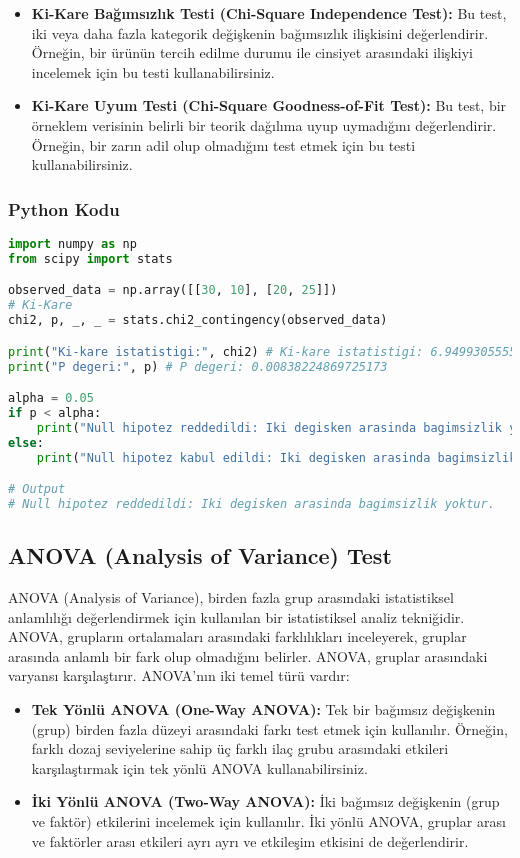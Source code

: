 \begin{itemize}
    \item \textbf{Ki-Kare Bağımsızlık Testi (Chi-Square Independence Test):} Bu test, iki veya daha fazla kategorik değişkenin bağımsızlık ilişkisini değerlendirir. Örneğin, bir ürünün tercih edilme durumu ile cinsiyet arasındaki ilişkiyi incelemek için bu testi kullanabilirsiniz.
    \item \textbf{Ki-Kare Uyum Testi (Chi-Square Goodness-of-Fit Test):} Bu test, bir örneklem verisinin belirli bir teorik dağılıma uyup uymadığını değerlendirir. Örneğin, bir zarın adil olup olmadığını test etmek için bu testi kullanabilirsiniz.
\end{itemize}

\subsubsection{Python Kodu}

\begin{lstlisting}[language=Python]
import numpy as np
from scipy import stats

observed_data = np.array([[30, 10], [20, 25]])
# Ki-Kare
chi2, p, _, _ = stats.chi2_contingency(observed_data)

print("Ki-kare istatistigi:", chi2) # Ki-kare istatistigi: 6.949930555555551
print("P degeri:", p) # P degeri: 0.00838224869725173

alpha = 0.05
if p < alpha:
    print("Null hipotez reddedildi: Iki degisken arasinda bagimsizlik yoktur.")
else:
    print("Null hipotez kabul edildi: Iki degisken arasinda bagimsizlik vardir.")

# Output
# Null hipotez reddedildi: Iki degisken arasinda bagimsizlik yoktur.
\end{lstlisting}

\newpage

\subsection{ANOVA (Analysis of Variance) Test}
ANOVA (Analysis of Variance), birden fazla grup arasındaki istatistiksel anlamlılığı değerlendirmek için kullanılan bir istatistiksel analiz tekniğidir. ANOVA, grupların ortalamaları arasındaki farklılıkları inceleyerek, gruplar arasında anlamlı bir fark olup olmadığını belirler. ANOVA, gruplar arasındaki varyansı karşılaştırır. ANOVA'nın iki temel türü vardır:

\begin{itemize}
    \item \textbf{Tek Yönlü ANOVA (One-Way ANOVA):} Tek bir bağımsız değişkenin (grup) birden fazla düzeyi arasındaki farkı test etmek için kullanılır. Örneğin, farklı dozaj seviyelerine sahip üç farklı ilaç grubu arasındaki etkileri karşılaştırmak için tek yönlü ANOVA kullanabilirsiniz.
    \item \textbf{İki Yönlü ANOVA (Two-Way ANOVA):} İki bağımsız değişkenin (grup ve faktör) etkilerini incelemek için kullanılır. İki yönlü ANOVA, gruplar arası ve faktörler arası etkileri ayrı ayrı ve etkileşim etkisini de değerlendirir.
\end{itemize}


